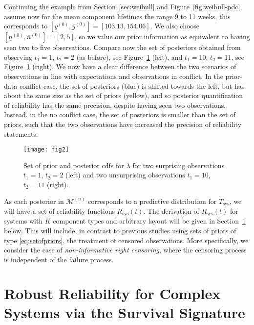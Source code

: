 \documentclass[Journal,SectionNumbers,SingleSpace,InsideFigs]{ascelike}
\newcommand{\uz}{^{(0)}} %
\newcommand{\un}{^{(n)}} %
\newcommand{\ul}[1]{\underline{#1}}
\newcommand{\ol}[1]{\overline{#1}}
\newcommand{\Rsys}{R_\text{sys}}
\def\Rsys{R_\text{sys}}
\def\Tsys{T_\text{sys}}
\def\yzl{\ul{y}\uz}
\def\yzu{\ol{y}\uz}
\def\nzl{\ul{n}\uz}
\def\nzu{\ol{n}\uz}
\def\MN{\mathcal{M}\un}
\begin{document}
Continuing the example from Section~\ref{sec:weibull} and Figure~\ref{fig:weibull-pdc},
assume now for the mean component lifetimes the range 9 to 11 weeks,
this corresponds to $[\yzl,\yzu] = [103.13, 154.06]$.
We also choose $[\nzl,\nzu] =[2, 5]$,
so we value our prior information as equivalent to having seen two to five observations.
Compare now the set of posteriors obtained from observing
$t_1 = 1$, $t_2 = 2$ (as before), see Figure~\ref{fig:setofpost-pdc-nopdc} (left),
and $t_1 = 10$, $t_2 = 11$, see Figure~\ref{fig:setofpost-pdc-nopdc} (right).
We now have a clear difference between the two scenarios of
observations in line with expectations and observations in conflict.
In the prior-data conflict case, the set of posteriors (blue)
is shifted towards the left, but has about the same size as the set of priors (yellow),
and so posterior quantification of reliability has the same precision,
despite having seen two observations.
Instead, in the no conflict case, the set of posteriors is smaller than the set of priors,
such that the two observations have increased the precision of reliability statements.

\begin{figure}
\texttt{[image: fig2]}
\caption{Set of prior and posterior cdfs for $\lambda$ for two surprising observations $t_1 = 1$, $t_2 = 2$ (left)
and two unsurprising observations $t_1 = 10$, $t_2 = 11$ (right).}
\label{fig:setofpost-pdc-nopdc}
\end{figure}

As each posterior in $\MN$ corresponds to a predictive distribution for $\Tsys$,
we will have a set of reliability functions $\Rsys(t)$.
The derivation of $\Rsys(t)$ for systems with $K$ component types and arbitrary layout
will be given in Section~\ref{sec:robrel} below.
This will include, in contrast to previous studies using sets of priors of type 
\eqref{eq:setofpriors}, the treatment of censored observations.
More specifically, we consider the case of \emph{non-informative right censoring},
where the censoring process is independent of the failure process.


\section{Robust Reliability for Complex Systems via the Survival Signature}
\label{sec:robrel}
\end{document}
